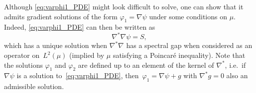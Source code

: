 \begin{remark}
Although \eqref{eq:varphi1_PDE} might look difficult to solve, one can show that it admits gradient solutions of the form $\varphi_1 = \nabla\psi$ under some conditions on $\mu$. Indeed, \eqref{eq:varphi1_PDE} can then be written as
%
\begin{equation}
	\nabla^*\nabla \psi = S, %
\end{equation}
%
which has a unique solution when $\nabla^*\nabla$ has a spectral gap when considered as an operator on~$L^2(\mu)$ (implied by $\mu$ satisfying a Poincar\'e inequality).%
Note that the solutions $\varphi_1$ and $\varphi_2$ are defined up to an element of the kernel of $\nabla^*$, i.e.\ if $\nabla\psi$ is a solution to~\eqref{eq:varphi1_PDE}, then~$\varphi_1 = \nabla\psi + g$ with $\nabla^*g = 0$ also an admissible solution. %
\end{remark}

